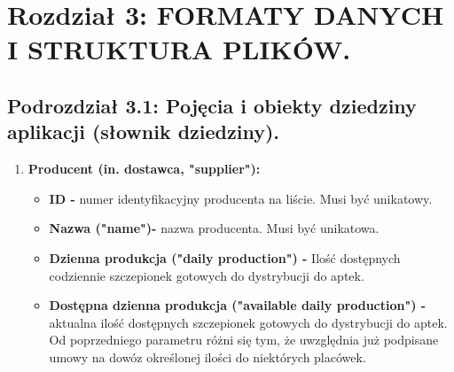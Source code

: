 \documentclass[a4paper]{article}
\begin{document}
\newpage
\section*{Rozdział 3: FORMATY DANYCH I STRUKTURA PLIKÓW.}
\subsection*{Podrozdział 3.1: Pojęcia i obiekty dziedziny aplikacji (słownik dziedziny).}

\begin{enumerate}
    \item \textbf{Producent (in. dostawca, "supplier"):}
          \begin{itemize}
              \item \textbf{ID -} numer identyfikacyjny producenta na liście. Musi być unikatowy.
              \item \textbf{Nazwa ("name")-} nazwa producenta. Musi być unikatowa.
			\item \textbf{Dzienna produkcja ("daily production") -} Ilość dostępnych codziennie szczepionek gotowych do dystrybucji do aptek.
			\item \textbf{Dostępna dzienna produkcja ("available daily production") -} aktualna ilość dostępnych szczepionek gotowych do dystrybucji do aptek. Od poprzedniego parametru różni się tym, że uwzględnia już podpisane umowy na dowóz określonej ilości do niektórych placówek.
          \end{itemize}
	

\end{enumerate}
\end{document}
